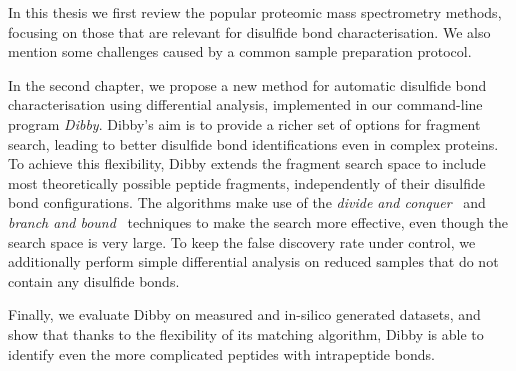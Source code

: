 In this thesis we first review the popular proteomic mass spectrometry methods, focusing on those that are relevant for disulfide bond characterisation. We also mention some challenges caused by a common sample preparation protocol.

In the second chapter, we propose a new method for automatic disulfide bond characterisation using differential analysis, implemented in our command-line program \emph{Dibby}. Dibby's aim is to provide a richer set of options for fragment search, leading to better disulfide bond identifications even in complex proteins. To achieve this flexibility, Dibby extends the fragment search space to include most theoretically possible peptide fragments, independently of their disulfide bond configurations. The algorithms make use of the \emph{divide and conquer}~\cite{smith1985design} and \emph{branch and bound}~\cite{boyd2007branch} techniques to make the search more effective, even though the search space is very large. To keep the false discovery rate under control, we additionally perform simple differential analysis on reduced samples that do not contain any disulfide bonds.

Finally, we evaluate Dibby on measured and in-silico generated datasets, and show that thanks to the flexibility of its matching algorithm, Dibby is able to identify even the more complicated peptides with intrapeptide bonds.
